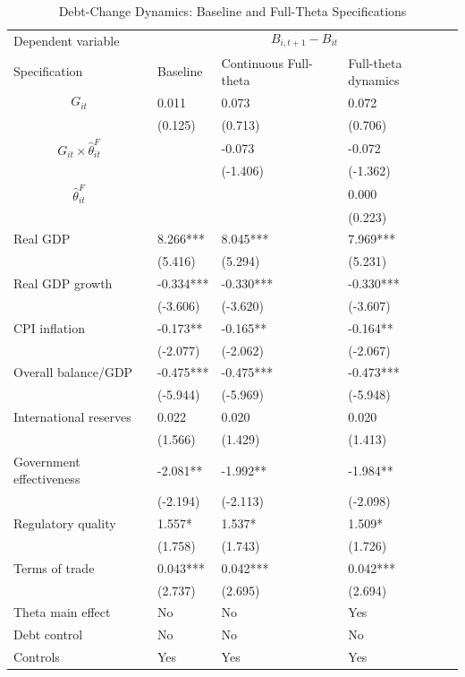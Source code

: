 \begin{table}[H]\centering
\begin{threeparttable}
\caption{Debt-Change Dynamics: Baseline and Full-Theta Specifications}
\label{tab:debt_change_combined_fulltheta}
\scriptsize
\begin{tabularx}{\textwidth}{lYYY}
\toprule
Dependent variable &  \\
\cmidrule(lr){2-4}
Specification & Baseline & Continuous Full-theta & Full-theta dynamics \\
\midrule
$$G_{it}$$ & 0.011 & 0.073 & 0.072 \\
 & (0.125) & (0.713) & (0.706) \\
$$G_{it}\times\widehat{\theta}^{F}_{it}$$ &  & -0.073 & -0.072 \\
 &  & (-1.406) & (-1.362) \\
$$\widehat{\theta}^{F}_{it}$$ &  &  & 0.000 \\
 &  &  & (0.223) \\
Real GDP & 8.266*** & 8.045*** & 7.969*** \\
 & (5.416) & (5.294) & (5.231) \\
Real GDP growth & -0.334*** & -0.330*** & -0.330*** \\
 & (-3.606) & (-3.620) & (-3.607) \\
CPI inflation & -0.173** & -0.165** & -0.164** \\
 & (-2.077) & (-2.062) & (-2.067) \\
Overall balance/GDP & -0.475*** & -0.475*** & -0.473*** \\
 & (-5.944) & (-5.969) & (-5.948) \\
International reserves & 0.022 & 0.020 & 0.020 \\
 & (1.566) & (1.429) & (1.413) \\
Government effectiveness & -2.081** & -1.992** & -1.984** \\
 & (-2.194) & (-2.113) & (-2.098) \\
Regulatory quality & 1.557* & 1.537* & 1.509* \\
 & (1.758) & (1.743) & (1.726) \\
Terms of trade & 0.043*** & 0.042*** & 0.042*** \\
 & (2.737) & (2.695) & (2.694) \\
\midrule
Theta main effect & No & No & Yes \\
Debt control & No & No & No \\
Controls & Yes & Yes & Yes \\

\end{tabularx}
\end{threeparttable}
\end{table}
